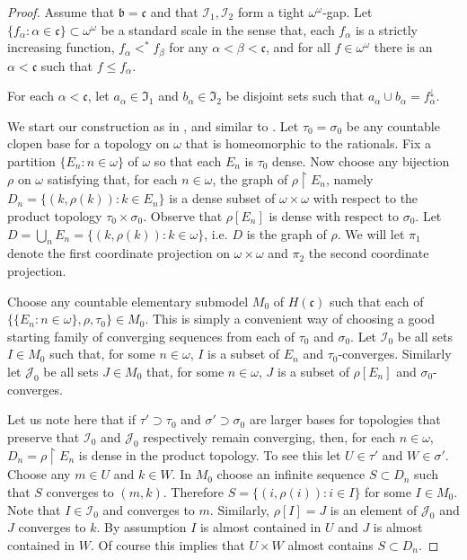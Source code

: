 \documentclass{amsart}
\theoremstyle{definition}
\theoremstyle{remark}
\begin{document}
\begin{proof} Assume that $\mathfrak b = \mathfrak c$ and that
$\mathcal I_1,\mathcal I_2$ form a tight $\omega^\omega$-gap. 
Let $\{ f_\alpha : \alpha \in \mathfrak c\}\subset \omega^\omega$ 
be   a standard scale in the sense that, each $f_\alpha$ is a strictly increasing
function, $f_\alpha<^*f_\beta$ for any $\alpha < \beta < \mathfrak c$,
and for all $f\in \omega^\omega$ there is an $\alpha<\mathfrak c$
such that $f\leq f_\alpha$. 

For each $\alpha<\mathfrak c$, let $a_\alpha\in \mathfrak I_1$
and $b_\alpha\in \mathfrak I_2$ be disjoint sets such that
 $a_\alpha\cup b_\alpha = f_\alpha^{\downarrow}$. 
 \medskip

We start our construction as in   \cite{BFZ}, and similar to \cite{MA3}.
 Let $\tau_0=\sigma_0$ be any countable clopen base for a topology
 on $\omega$ that is homeomorphic to the rationals. 
 Fix a partition $\{ E_n : n\in\omega\}$ of $\omega$ so that
 each $E_n$ is $\tau_0$ dense. Now choose any bijection $\rho$
 on $\omega$ satisfying that, for each $n\in\omega$,
   the graph of $\rho\restriction E_n$, namely $D_n =
   \{ (k, \rho(k)) : k\in E_n\}$
   is a dense subset of $\omega\times\omega$ with respect to the 
   product topology $\tau_0\times \sigma_0$. 
   Observe that $\rho[E_n]$ is dense with respect to $\sigma_0$.
   Let $D =\bigcup_n E_n = \{ (k, \rho(k)) : k\in \omega\}$,
   i.e. $D$ is the graph of $\rho$.   We will let
   $\pi_1$ denote the first coordinate projection on $\omega\times\omega$
   and $\pi_2$ the second coordinate projection.
   
   Choose any countable elementary submodel $M_0$ of 
    $H(\mathfrak c)$ such that each of 
     $\{    \{E_n : n\in\omega\}, \rho, \tau_0\}\in M_0$.
     This is simply a convenient way of choosing a good
     starting family of converging sequences from
     each of $\tau_0$ and $\sigma_0$.  Let
     $\mathcal I_0$ be all sets $I\in M_0$
such     that, for some $n\in\omega$, $I$ is a subset
     of $E_n$ and $\tau_0$-converges.
     Similarly let $\mathcal J_0$ be all sets
     $J\in M_0$ that, for some $n\in \omega$,
      $J$ is a subset of $\rho[E_n]$ and $\sigma_0$-converges.

      Let us note here that if $\tau'\supset \tau_0$
      and $
      \sigma'\supset \sigma_0$ are larger
      bases for topologies that preserve that 
      $\mathcal I_0$ and $\mathcal J_0$ respectively remain
      converging, then, for each $n\in\omega$,
         $D_n = \rho\restriction E_n$ is dense in the product
         topology. To see this let $U\in \tau'$ and $W\in \sigma'$.
         Choose any $m\in U$ and $k\in W$. In $M_0$ choose an infinite 
         sequence
         $S\subset D_n$ such that $S$ converges to $(m,k)$.
         Therefore $S = \{ (i,\rho(i)) : i\in I\}$ for some
         $I\in M_0$. Note that  $I\in \mathcal I_0$ and converges
         to $m$. Similarly,     $\rho[I] = J$ is an element of $\mathcal J_0$
           and $J$ converges to $k$. By assumption $I$ is almost
           contained in $U$ and $J$ is almost contained in $W$. 
           Of course this implies that $U\times W$ almost contains
           $S\subset D_n$.\medskip


\end{proof}
\end{document}
